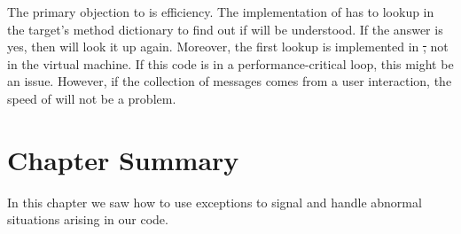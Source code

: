 \documentclass[a4paper,10pt,twoside]{book}
\begin{document}
The primary objection to  is efficiency.  The implementation of  has to lookup  in the target's method dictionary  to find out if  will be understood.  If the answer is yes, then  will look it up again.  Moreover, the first lookup is implemented in \st, not in the virtual machine.  If this code is in a performance-critical loop, this might be an issue.  However, if the collection of messages comes from a user interaction, the speed of  will not be a problem.

\section{Chapter Summary}

In this chapter we saw how to use exceptions to signal and handle abnormal situations arising in our code.
\end{document}
